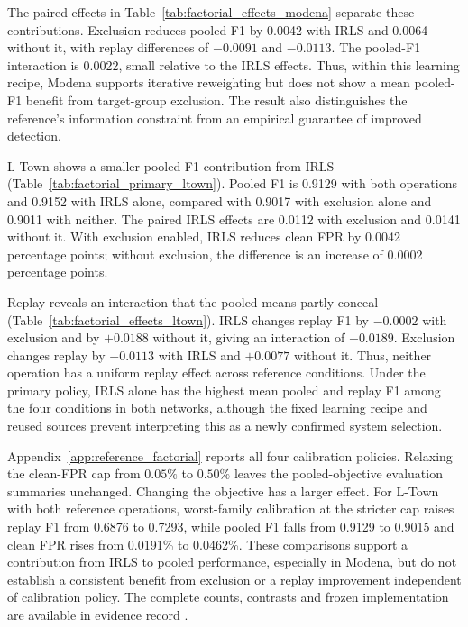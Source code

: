 The paired effects in Table~\ref{tab:factorial_effects_modena} separate these contributions. Exclusion reduces pooled F1 by 0.0042 with IRLS and 0.0064 without it, with replay differences of $-0.0091$ and $-0.0113$. The pooled-F1 interaction is 0.0022, small relative to the IRLS effects. Thus, within this learning recipe, Modena supports iterative reweighting but does not show a mean pooled-F1 benefit from target-group exclusion. The result also distinguishes the reference's information constraint from an empirical guarantee of improved detection.




L-Town shows a smaller pooled-F1 contribution from IRLS (Table~\ref{tab:factorial_primary_ltown}). Pooled F1 is 0.9129 with both operations and 0.9152 with IRLS alone, compared with 0.9017 with exclusion alone and 0.9011 with neither. The paired IRLS effects are 0.0112 with exclusion and 0.0141 without it. With exclusion enabled, IRLS reduces clean FPR by 0.0042 percentage points; without exclusion, the difference is an increase of 0.0002 percentage points.

Replay reveals an interaction that the pooled means partly conceal (Table~\ref{tab:factorial_effects_ltown}). IRLS changes replay F1 by $-0.0002$ with exclusion and by $+0.0188$ without it, giving an interaction of $-0.0189$. Exclusion changes replay by $-0.0113$ with IRLS and $+0.0077$ without it. Thus, neither operation has a uniform replay effect across reference conditions. Under the primary policy, IRLS alone has the highest mean pooled and replay F1 among the four conditions in both networks, although the fixed learning recipe and reused sources prevent interpreting this as a newly confirmed system selection.




Appendix~\ref{app:reference_factorial} reports all four calibration policies. Relaxing the clean-FPR cap from $0.05\%$ to $0.50\%$ leaves the pooled-objective evaluation summaries unchanged. Changing the objective has a larger effect. For L-Town with both reference operations, worst-family calibration at the stricter cap raises replay F1 from 0.6876 to 0.7293, while pooled F1 falls from 0.9129 to 0.9015 and clean FPR rises from 0.0191\% to 0.0462\%. These comparisons support a contribution from IRLS to pooled performance, especially in Modena, but do not establish a consistent benefit from exclusion or a replay improvement independent of calibration policy. The complete counts, contrasts and frozen implementation are available in evidence record .

\endgroup
